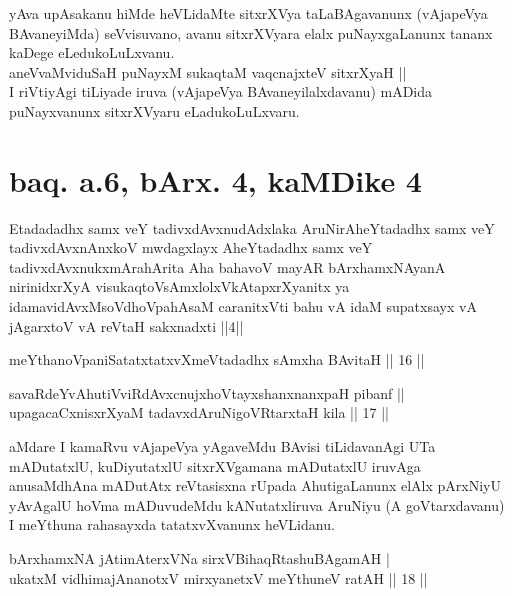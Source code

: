 \begin{artha}
yAva upAsakanu hiMde heVLidaMte sitxrXVya taLaBAgavanunx (vAjapeVya 
BAvaneyiMda) seVvisuvano, avanu sitxrXVyara elalx puNayxgaLanunx 
tananx kaDege eLedukoLuLxvanu. \\ aneVvaMviduSaH puNayxM sukaqtaM vaqcnajxteV sitxrXyaH || \\ I riVtiyAgi tiLiyade iruva 
(vAjapeVya BAvaneyilalxdavanu) mADida puNayxvanunx sitxrXVyaru eLadukoLuLxvaru.
\end{artha}

\section*{baq. a.6, bArx. 4, kaMDike 4}

\begin{shl}
Etadadadhx samx veY tadivxdAvxnudAdxlaka AruNirAheYtadadhx samx veY tadivxdAvxnAnxkoV mwdagxlayx AheYtadadhx samx veY tadivxdAvxnukxmArahArita Aha bahavoV mayAR bArxhamxNAyanA nirinidxrXyA visukaqtoV\s sAmxlolxVkAtapxrXyanitx ya idamavidAvxMsoV\s dhoVpahAsaM caranitxVti bahu vA idaM supatxsayx vA jAgarxtoV vA reVtaH sakxnadxti ||4||
\end{shl}

\begin{shl}
meYthanoVpaniSatatxtatxvXmeVtadadhx sAmx\s \s ha BAvitaH \hfill|| 16 || 
\end{shl}

\begin{shl}
savaRdeYvA\s \s hutiVviRdAvxcnujxhoVtayxshanxnanxpaH pibanf || \\
upagacaCxnisxrXyaM tadavxdAruNigoVRtarxtaH kila \hfill|| 17 || 
\end{shl}

\begin{artha}
aMdare I kamaRvu vAjapeVya yAgaveMdu BAvisi tiLidavanAgi UTa 
mADutatxlU, kuDiyutatxlU sitxrXVgamana mADutatxlU iruvAga anusaMdhAna 
mADutAtx reVtasisxna rUpada AhutigaLanunx elAlx pArxNiyU yAvAgalU 
hoVma mADuvudeMdu kANutatxliruva AruNiyu (A goVtarxdavanu) I meYthuna 
rahasayxda tatatxvXvanunx heVLidanu.
\end{artha}


\begin{shl}
bArxhamxNA jAtimAterxVNa sirxVBihaqRtashuBAgamAH | \\
ukatxM vidhimajAnanotxV mirxyanetxV meYthuneV ratAH \hfill|| 18 || 
\end{shl}

